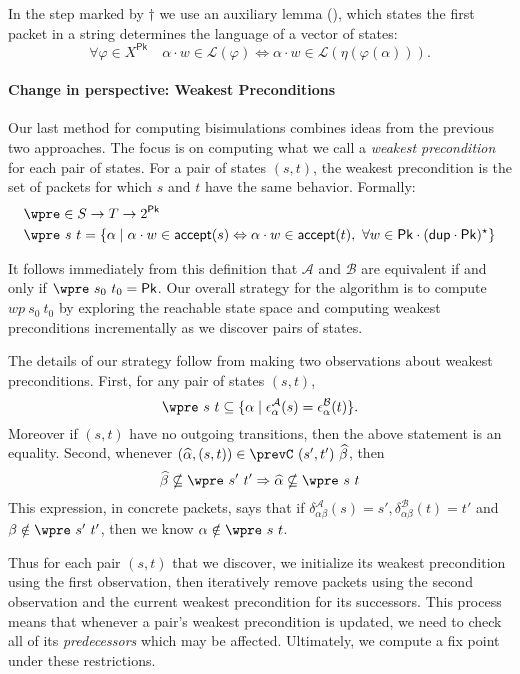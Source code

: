 \documentclass[acmsmall,dvipsnames,nonacm]{acmart}
\newcommand\Pk{\mathsf{Pk}}
\newcommand\sympk{\widehat\alpha}
\newcommand\sympkp{\widehat\beta}
\newcommand\pk{\alpha}
\newcommand\pkp{\beta}
\newcommand\dup{\mathsf{dup}}
\newcommand\accept{\mathsf{accept}}
\newcommand\A{\mathcal{A}}
\newcommand\B{\mathcal{B}}
\newcommand\epsA{\epsilon^\A_\pk}
\newcommand\epsB{\epsilon^\B_\pk}
\newcommand\delA{\delta^\A_{\pk\pkp}}
\newcommand\delB{\delta^\B_{\pk\pkp}}
\begin{document}
In the step marked by $\dagger$ we use an auxiliary lemma
(), which states the first packet in a string
determines the language of a vector of states:
\[
\forall \varphi\in X^\Pk\quad  \pk\cdot w \in \mathcal L ( \varphi) \iff  \pk\cdot w \in \mathcal L ( \eta(\varphi(\pk))).
\]

\paragraph*{Change in perspective: Weakest Preconditions}

Our last method for computing bisimulations combines ideas from the
previous two approaches. The focus is on computing what we call a
\emph{weakest precondition} for each pair of states. For a pair of
states $(s,t)$, the weakest precondition is the set of packets for
which $s$ and $t$ have the same behavior. Formally:
\begin{align*}
    &\wpre \in S \to T \to 2^\Pk \\
    &\wpre\ s\ t = \{ \pk \mid \pk\cdot w\in \accept(s) \Leftrightarrow
                             \pk\cdot w \in \accept(t),~\forall w\in \Pk\cdot(\dup\cdot\Pk)^\star\}
\end{align*}

It follows immediately from this definition that $\A$ and $\B$ are
equivalent if and only if $\wpre\ s_0\ t_0 = \Pk$. Our overall
strategy for the algorithm is to compute $wp\ s_0\ t_0$ by exploring
the reachable state space and computing weakest preconditions
incrementally as we discover pairs of states.

The details of our strategy follow from making two observations about
weakest preconditions. First, for any pair of states $(s,t)$,
%
\[ \wpre\ s\ t \subseteq \{ \pk \mid \epsA(s) = \epsB(t) \}. \]
%
Moreover if $(s,t)$ have no outgoing transitions, then the above statement is an
equality.
%
Second, whenever $(\sympk, (s,t)) \in \prevC\ (s',t')\ \sympkp$, then
\[ \sympkp \nsubseteq \wpre\ s'\ t' \Rightarrow \sympk \nsubseteq \wpre\ s\ t\]
%
This expression, in concrete packets, says that if $\delA(s) = s',
\delB(t) = t'$ and $\pkp \notin \wpre\ s'\ t'$, then we know $\pk
\notin \wpre\ s\ t$.

Thus for each pair $(s,t)$ that we discover, we initialize its weakest
precondition using the first observation, then iteratively remove
packets using the second observation and the current weakest
precondition for its successors.  This process means that whenever a
pair's weakest precondition is updated, we need to check all of its
\emph{predecessors} which may be affected. Ultimately, we compute a
fix point under these restrictions.
\end{document}
